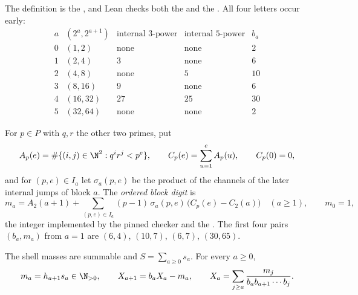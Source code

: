 \documentclass[11pt]{article}
\begin{document}
\noindent The definition is the
, and Lean checks both the
 and the
.  All four letters occur early:
\[
\begin{array}{c|c|c|c|c}
a & (2^{a},2^{a+1}) & \text{internal }3\text{-power} & \text{internal }5\text{-power} & b_a\\ \hline
0 & (1,2)   & \text{none} & \text{none} & 2\\
1 & (2,4)   & 3           & \text{none} & 6\\
2 & (4,8)   & \text{none} & 5           & 10\\
3 & (8,16)  & 9           & \text{none} & 6\\
4 & (16,32) & 27          & 25          & 30\\
5 & (32,64) & \text{none} & \text{none} & 2
\end{array}
\]

For $p\in P$ with $q,r$ the other two primes, put
\[
 A_p(e)=\#\{(i,j)\in\N^2:q^{i}r^{j}<p^{e}\},\qquad
 C_p(e)=\sum_{u=1}^{e}A_p(u),\qquad C_p(0)=0 ,
\]
and for $(p,e)\in I_a$ let $\sigma_a(p,e)$ be the product of the channels of
the later internal jumps of block $a$.  The \emph{ordered block digit} is
\begin{equation}\label{long269:eq:actual-digit}
 m_a=A_2(a+1)+\sum_{(p,e)\in I_a}(p-1)\,\sigma_a(p,e)\,
        \bigl(C_p(e)-C_2(a)\bigr)\quad(a\ge1),
 \qquad m_0=1 ,
\end{equation}
the integer implemented by the pinned checker and the
.  The first four pairs $(b_a,m_a)$ from $a=1$ are
$(6,4)$, $(10,7)$, $(6,7)$, $(30,65)$.

\begin{theorem}\label{long269:res:actual-orbit}
The shell masses are summable and $S=\sum_{a\ge0}s_a$.  For every $a\ge0$,
\begin{equation}\label{long269:eq:shell-digit-identity}
 m_a=h_{a+1}s_a\in\N_{>0},
 \qquad
 X_{a+1}=b_aX_a-m_a,
 \qquad
 X_a=\sum_{j\ge a}\frac{m_j}{b_ab_{a+1}\cdots b_j} .
\end{equation}
\end{theorem}
\end{document}
